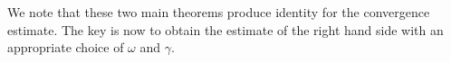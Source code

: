 
We note that these two main theorems produce identity for the convergence estimate. The key is now to obtain the estimate of the right hand side with an appropriate choice of $\omega$ and $\gamma$. 

